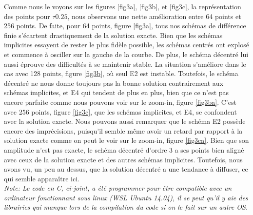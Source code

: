 \documentclass{article}
\begin{document}
Comme nous le voyons sur les figures \ref{fig3a}, \ref{fig3b}, et \ref{fig3c}, la représentation des points pour $\tau 0.25$, nous observons une nette amélioration entre 64 points et 256 points. De faite, pour 64 points, figure  \ref{fig3a}, tous nos schémas de différence finie s'écartent drastiquement de la solution exacte. Bien que les schémas implicites essayent de rester le plus fidèle possible, les schémas centrés ont explosé et commence à osciller sur la gauche de la courbe. De plus, le schéma décentré lui aussi éprouve des difficultés à se maintenir stable. La situation s'améliore dans le cas avec 128 points, figure  \ref{fig3b}, où seul E2 est instable. Toutefois, le schéma décentré ne nous donne toujours pas la bonne solution contrairement aux schémas implicites, et E4 qui tendent de plus en plus, bien que ce n'est pas encore parfaite comme nous pouvons voir sur le zoom-in, figure  \ref{fig3ba}. C'est avec 256 points, figure  \ref{fig3c}, que les schémas implicites, et E4, se confondent avec la solution exacte. Nous pouvons aussi remarquer que le schéma E2 possède encore des imprécisions, puisqu'il semble même avoir un retard par rapport à la solution exacte comme on peut le voir sur le zoom-in, figure  \ref{fig3ca}. Bien que son amplitude n'est pas exacte, le schéma décentré d'ordre 3 a ses points bien aligné avec ceux de la solution exacte et des autres schémas implicites. Toutefois, nous avons vu, un peu au dessus, que la solution décentré a une tendance à diffuser, ce qui semble apparaître ici. \\

\textit{Note: Le code en C, ci-joint, a été programmer pour être compatible avec un ordinateur fonctionnant sous linux (WSL Ubuntu 14.04), il se peut qu'il y aie des librairies qui manque lors de la compilation du code si on le fait sur un autre OS.}
\end{document}
